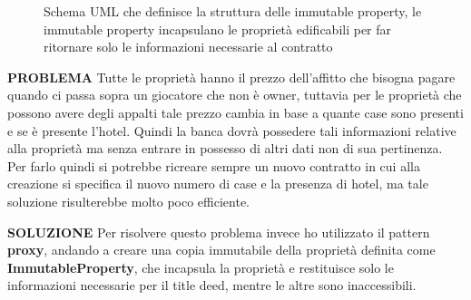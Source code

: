 \begin{figure}[H]
    \centering
    \caption{Schema UML che definisce la struttura delle immutable property, 
    le immutable property incapsulano le proprietà edificabili per far ritornare solo le informazioni necessarie al contratto}
	\label{img:Proxy}
\end{figure}
\textbf{PROBLEMA}\newline
Tutte le proprietà hanno il prezzo dell'affitto che bisogna pagare quando ci passa sopra un giocatore che non è owner, 
tuttavia per le proprietà che possono avere degli appalti tale prezzo cambia in base a quante case sono presenti e se è presente l'hotel.
Quindi la banca dovrà possedere tali informazioni relative alla proprietà ma senza entrare in possesso di altri dati non di sua pertinenza.
Per farlo quindi si potrebbe ricreare sempre un nuovo contratto in cui alla creazione si specifica il nuovo numero di case e la presenza di hotel, 
ma tale soluzione risulterebbe molto poco efficiente.\newline

\textbf{SOLUZIONE}\newline
Per risolvere questo problema invece ho utilizzato il pattern \textbf{proxy}, 
andando a creare una copia immutabile della proprietà definita come \textbf{ImmutableProperty}, 
che incapsula la proprietà e restituisce solo le informazioni necessarie per il title deed, mentre le altre sono inaccessibili.\newline